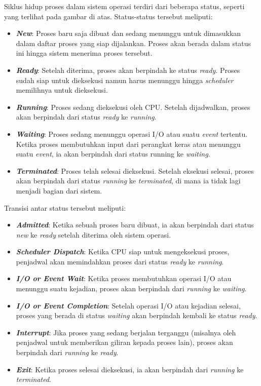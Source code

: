 \documentclass[12pt]{article}
\begin{document}
\noindent Siklus hidup proses dalam sistem operasi terdiri dari beberapa status, seperti yang terlihat pada gambar di atas. Status-status tersebut meliputi:
\begin{itemize}
    \item \textbf{\textit{New}}: Proses baru saja dibuat dan sedang menunggu  untuk dimasukkan dalam daftar proses yang siap dijalankan. Proses akan berada dalam status ini hingga sistem menerima proses tersebut.
    \item \textbf{\textit{Ready}}: Setelah diterima, proses akan berpindah ke status \textit{ready}. Proses sudah siap untuk dieksekusi namun harus menunggu hingga \textit{scheduler} memilihnya untuk dieksekusi.
    \item \textbf{\textit{Running}}: Proses sedang dieksekusi oleh CPU. Setelah dijadwalkan, proses akan berpindah dari status \textit{ready} ke \textit{running}.
    \item \textbf{\textit{Waiting}}: Proses sedang menunggu operasi I/O atau suatu \textit{event} tertentu. Ketika proses membutuhkan input dari perangkat keras atau menunggu suatu \textit{event}, ia akan berpindah dari status running ke \textit{waiting}.
    \item \textbf{\textit{Terminated}}: Proses telah selesai dieksekusi. Setelah eksekusi selesai, proses akan berpindah dari status \textit{running} ke \textit{terminated}, di mana ia tidak lagi menjadi bagian dari sistem.
\end{itemize}
Transisi antar status tersebut meliputi:
\begin{itemize}
    \item \textbf{\textit{Admitted}}: Ketika sebuah proses baru dibuat, ia akan berpindah dari status \textit{new} ke \textit{ready} setelah diterima oleh sistem operasi.
    \item \textbf{\textit{Scheduler Dispatch}}: Ketika CPU siap untuk mengeksekusi proses, penjadwal akan memindahkan proses dari status \textit{ready} ke \textit{running}.
    \item \textbf{\textit{I/O or Event Wait}}: Ketika proses membutuhkan operasi I/O atau menunggu suatu kejadian, proses akan berpindah dari \textit{running} ke \textit{waiting}.
    \item \textbf{\textit{I/O or Event Completion}}: Setelah operasi I/O atau kejadian selesai, proses yang berada di status \textit{waiting} akan berpindah kembali ke status \textit{ready}.
    \item \textbf{\textit{Interrupt}}: Jika proses yang sedang berjalan terganggu (misalnya oleh penjadwal untuk memberikan giliran kepada proses lain), proses akan berpindah dari \textit{running} ke \textit{ready}.
    \item \textbf{\textit{Exit}}: Ketika proses selesai dieksekusi, ia akan berpindah dari \textit{running} ke \textit{terminated}.
\end{itemize}
\end{document}
